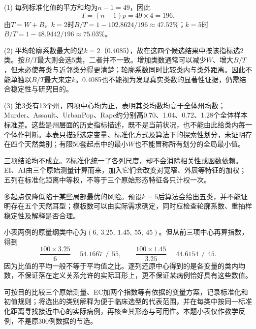 (1) 每列标准化值的平方和均为$n-1=49$，因此\[T=(n-1)p=49\times4=196.\]由$T=W+B$，$k=2$时$B/T=1-102.8624/196\approx47.52\%$；$k=5$时$B/T=1-48.9442/196\approx75.03\%$。\par (2) 平均轮廓系数最大的是$k=2$（0.4085），故在这四个候选结果中按该指标选2类。按$B/T$最大则会选5类，二者并不一致。增加类数通常可以减少$W$、增大$B/T$，但未必使每类与近邻类分得更清楚；轮廓系数同时比较类内与类外距离。因此不能单独以$B/T$最大来定$k$。0.4085也不能视为发现真实类数的显著性证据，仍需结合稳定性与研究目的。\par (3) 第3类有13个州，四项中心均为正，表明其类均数均高于全体州均数；Murder、Assault、UrbanPop、Rape约分别高0.70、1.04、0.72、1.28个全体样本标准差。这些是州层面的历史指标描述，既不是当前状况，也不能由此给类内每一个体作判断。本表只描述选定变量、标准化方式及算法下的探索性划分，未证明存在四个天然类别；有限50套起点中的最小$W$也不能冒称所有划分的全局最小值。
\par\nobreak\smallskip{}

三项结论均不成立。Z标准化统一了各列尺度，却不会消除相关性或函数依赖。EI、AI由三个原始测量计算而来，加入它们会改变对宽窄、外展等特征的加权；五列在标准化距离中等权，不等于三个原始形态特征各只计权一次。\par 多起点仅降低陷于某些局部最优的风险。预设$k=5$后算法会给出五类，并不能证明存在五个天然耳型；模板数可以由实际需求确定，同时应检查轮廓系数、重抽样稳定性及解释是否合理。\par 小表两例的原量纲类中心为$(6,\ 3.25,\ 1.45,\ 55,\ 45)$。但从前三项中心再算指数，得到\[\frac{100\times3.25}{6}=54.1667\ne55,\qquad\frac{100\times1.45}{3.25}=44.6154\ne45.\]因为比值的平均一般不等于平均值之比。逐列还原中心得到的是各变量的类内均数，不保证落在定义关系允许的实际耳形上，更不保证某病例恰好具有这些数值。\par 可按目的比较三个原始测量、EC加两个指数等有依据的变量方案，记录标准化和初值规则；将选出的类别解释为便于临床选型的代表范围，并在每类中按同一标准化距离寻找接近中心的实际病例，再核查其形态与可用性。本题小表仅作教学反例，不是原300例数据的节选。
\par\nobreak\smallskip{}

